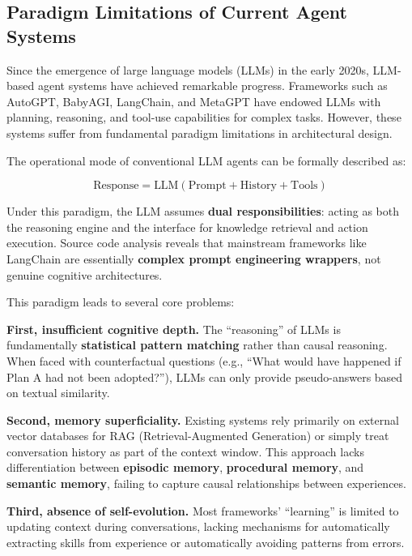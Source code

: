 \documentclass[10pt,twocolumn,letterpaper]{article}
\begin{document}
\subsection{Paradigm Limitations of Current Agent Systems}
\label{ssec:paradigm_limitations}

Since the emergence of large language models (LLMs) in the early 2020s, LLM-based agent systems have achieved remarkable progress. Frameworks such as AutoGPT, BabyAGI, LangChain, and MetaGPT have endowed LLMs with planning, reasoning, and tool-use capabilities for complex tasks. However, these systems suffer from fundamental paradigm limitations in architectural design.

The operational mode of conventional LLM agents can be formally described as:

\begin{equation}
    \text{Response} = \text{LLM}(\text{Prompt} + \text{History} + \text{Tools})
    \label{eq:llm_agent_mode}
\end{equation}

Under this paradigm, the LLM assumes \textbf{dual responsibilities}: acting as both the reasoning engine and the interface for knowledge retrieval and action execution. Source code analysis reveals that mainstream frameworks like LangChain are essentially \textbf{complex prompt engineering wrappers}, not genuine cognitive architectures.

This paradigm leads to several core problems:

\textbf{First, insufficient cognitive depth.} The ``reasoning'' of LLMs is fundamentally \textbf{statistical pattern matching} rather than causal reasoning. When faced with counterfactual questions (e.g., ``What would have happened if Plan A had not been adopted?''), LLMs can only provide pseudo-answers based on textual similarity.

\textbf{Second, memory superficiality.} Existing systems rely primarily on external vector databases for RAG (Retrieval-Augmented Generation) or simply treat conversation history as part of the context window. This approach lacks differentiation between \textbf{episodic memory}, \textbf{procedural memory}, and \textbf{semantic memory}, failing to capture causal relationships between experiences.

\textbf{Third, absence of self-evolution.} Most frameworks' ``learning'' is limited to updating context during conversations, lacking mechanisms for automatically extracting skills from experience or automatically avoiding patterns from errors.
\end{document}
